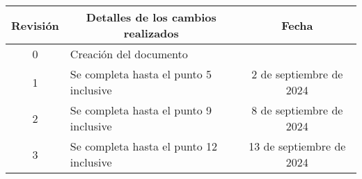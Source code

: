 \begin{table}[ht]
	\label{tab:registro}
	\centering
	\begin{tabularx}{\linewidth}{@{}|c|X|c|@{}}
		\hline
		\rowcolor[HTML]{C0C0C0}
		Revisión 	& \multicolumn{1}{c|}{\cellcolor[HTML]{C0C0C0}Detalles de los cambios realizados} 	& Fecha                       \\ \hline
		0        	& Creación del documento                                                          	& \fechaInicioName            \\ \hline
		1        	& Se completa hasta el punto 5 inclusive                                          	& {2} de {septiembre} de 2024 \\ \hline
		2      		& Se completa hasta el punto 9 inclusive											& {8} de {septiembre} de 2024 \\ \hline
		3      		& Se completa hasta el punto 12 inclusive											& {13} de {septiembre} de 2024 \\ \hline

	\end{tabularx}
\end{table}